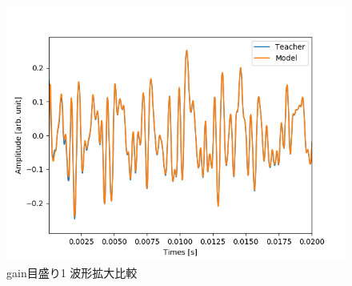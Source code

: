 \documentclass{jreport}		%
\begin{document}
\begin{figure}[htbp]
 \begin{center}
  \includegraphics[width=150mm]{gain1_output_hikaku.png}
 \end{center}
 \caption{gain目盛り1 波形拡大比較}
 \label{fig:one}
\end{figure}
\end{document}
